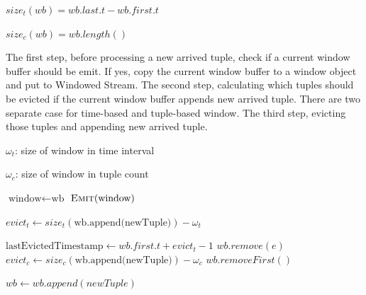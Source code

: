 $size_{t}(wb) = wb.last.t - wb.first.t$

$size_c(wb) = wb.length()$


\begin{algorithm}
\caption{Process new arrived tuple}
\label{algorithm:processNewTuple}
The first step, before processing a new arrived tuple, check if a current window buffer should be emit. If yes, copy the current window buffer to a window object and put to Windowed Stream. The second step, calculating which tuples should be evicted if the current window buffer appends new arrived tuple. There are two separate case for time-based and tuple-based window. The third step, evicting those tuples and appending new arrived tuple.


\algrenewcommand{}
\algrenewcommand{}
  \begin{algorithmic}[1]
  	
  			{$\omega_t$: size of window in time interval }
  			
  			{$\omega_c$: size of window in tuple count }
    
     
    		\State $\textrm{window} \gets \textrm{wb}$
    		\State $\textsc{Emit}(\textrm{window})$ 
    \EndIf
    
    		\State $ evict_t \gets size_t (\textrm{wb.append(newTuple)}) - \omega_t$
    
    		 
    			\State $ \textrm{lastEvictedTimestamp} \gets wb.first.t + evict_t - 1$
    					\State $wb.remove(e)$
    				\EndIf
    			\EndFor
    		\EndIf
    \Else {}
    		\State $evict_c \gets size_c(\textrm{wb.append(newTuple)}) - \omega_c$
    		 
    				\State $wb.removeFirst()$
    			\EndFor
    		\EndIf
    \EndIf
    
   	\State $wb \gets wb.append(newTuple)$ 
    
    
    \EndProcedure
  \end{algorithmic}
  




\end{algorithm}


